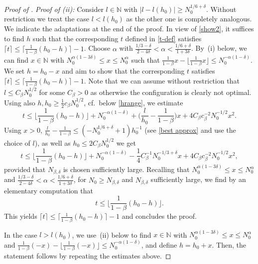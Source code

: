 \documentclass[reqno]{amsart}
\theoremstyle{plain}
\theoremstyle{definition}
\numberwithin{equation}{section}
\newcommand{\N}{\mathbb{N}}
\begin{document}
\begin{proof}[Proof of ]
\emph{Proof of {\rm (ii)}:}  Consider   $l \in \N$ with  $|l-l(h_0)| \ge N_0^{1/6 + \delta}$. Without restriction we treat the case $l < l(h_0)$ as the other one is completely analogous.  We indicate the adaptations at the end of the proof.   In view of \eqref{show2}, it suffices to find $h$ such that the corresponding $t$ defined in \eqref{t-def} satisfies  $\lceil t \rceil \le   \lceil  \frac{1}{1-\beta }    (h_0-h)\rceil - 1$. Choose $\alpha $ with  $ \frac{1/3 - \delta}{2-4\delta} < \alpha < \frac{1/6 + \delta}{1+3\delta} $.     By~(i) below, we can find   $x \in  \N $ with     $N_0^{\alpha(1-3\delta)} \le x \le N_0^\alpha$ such that  $  \frac{1}{1-\beta }    x - \lfloor   \frac{1}{1-\beta }    x \rfloor  \le N_0^{-\alpha (1-\delta)}$. We  set $h  =  h_0-x$ and aim to show that the corresponding $t$ satisfies $\lceil t \rceil \le   \lceil  \frac{1}{1-\beta }    (h_0-h)\rceil - 1$. Note that we can assume without restriction that $l \le  C_\beta  N_0^{1/2}$ for some $C_\beta>0$ as otherwise the configuration is clearly not optimal. Using also  $h,h_0 \ge   \frac{1}{2}  c_\beta  N_0^{1/2}$, cf.\ below \eqref{hrange}, we estimate
$$ { t \le  \Big\lfloor  \frac{1}{1-\beta }    (h_0-h) \Big\rfloor + N_0^{-\alpha (1-\delta)} + \Big(   \frac{l }{h_0} -  \frac{1}{1-\beta }     \Big) x  +   4  C_\beta c_\beta^{-2}  N_0^{-1/2} x^2 . } $$ 
Using $x>0$,  $\frac{l }{h_0} -  \frac{1}{1-\beta }     \le (- N_0^{1/6+\delta}+1) h_0^{-1} $ (see \eqref{best approx} and use the choice of $l$), as well as $h_0 \le  2  C_\beta  N_0^{1/2}$ we get
$$ t \le  \Big\lfloor  \frac{1}{1-\beta }    (h_0-h) \Big\rfloor + N_0^{-\alpha (1-\delta)}  - \frac{1}{ 4  } C_\beta^{-1}  N_0^{-1/3+\delta} x   +  4   C_\beta c_\beta^{-2}  N_0^{-1/2} x^2 ,  $$
provided that $ N_{\beta,\delta}  $ is chosen sufficiently large. Recalling that   $N_0^{\alpha(1-3\delta)} \le x \le N_0^\alpha$ and $ \frac{1/3 - \delta}{2-4\delta} < \alpha < \frac{1/6 + \delta}{1+3\delta} $,  for $N_0 \ge  N_{\beta,\delta}  $ and $ N_{\beta,\delta}  $ sufficiently large,  we find by an elementary computation that 
 $$t \le \Big\lfloor  \frac{1}{1-\beta }    (h_0-h) \Big\rfloor. $$
This  yields   $\lceil t \rceil \le   \lceil  \frac{1}{1-\beta }    (h_0-h)\rceil - 1$ and concludes the proof. 

 In the case $l >  l(h_0)$, we use~(ii) below to find $x \in \N$ with  $N_0^{\alpha(1-3\delta)} \le x \le N_0^\alpha$ and  $  \frac{1}{1-\beta }     (- x) - \lfloor   \frac{1}{1-\beta }     (-x) \rfloor  \le N_0^{-\alpha (1-\delta)}$, and define $h = h_0 + x$. Then, the statement follows by repeating the estimates above.  
\end{proof}
\end{document}
